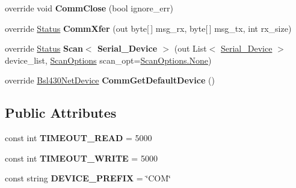 \begin{DoxyCompactItemize}
override void {\bfseries Comm\+Close} (bool ignore\+\_\+err)
\item 
\mbox{\label{class_b_s_l430___n_e_t_1_1_comm_1_1_comm_serial_a78d5d4bafe57eaaaffa336f272ca0051}} 
override \mbox{\hyperlink{class_b_s_l430___n_e_t_1_1_status}{Status}} {\bfseries Comm\+Xfer} (out byte\mbox{[}$\,$\mbox{]} msg\+\_\+rx, byte\mbox{[}$\,$\mbox{]} msg\+\_\+tx, int rx\+\_\+size)
\item 
\mbox{\label{class_b_s_l430___n_e_t_1_1_comm_1_1_comm_serial_ac393657c835b10ddc145bff688ca087e}} 
override \mbox{\hyperlink{class_b_s_l430___n_e_t_1_1_status}{Status}} {\bfseries Scan$<$ Serial\+\_\+\+Device $>$} (out List$<$ \mbox{\hyperlink{class_b_s_l430___n_e_t_1_1_comm_1_1_serial___device}{Serial\+\_\+\+Device}} $>$ device\+\_\+list, \mbox{\hyperlink{namespace_b_s_l430___n_e_t_a4cd6f8166a2a97ccb3405df2287d4ba8}{Scan\+Options}} scan\+\_\+opt=\mbox{\hyperlink{namespace_b_s_l430___n_e_t_a4cd6f8166a2a97ccb3405df2287d4ba8a6adf97f83acf6453d4a6a4b1070f3754}{Scan\+Options.\+None}})
\item 
\mbox{\label{class_b_s_l430___n_e_t_1_1_comm_1_1_comm_serial_a0b9cac5cd7fd047041f1a09bdd61fcc5}} 
override \mbox{\hyperlink{class_b_s_l430___n_e_t_1_1_bsl430_net_device}{Bsl430\+Net\+Device}} {\bfseries Comm\+Get\+Default\+Device} ()
\end{DoxyCompactItemize}
\subsection*{Public Attributes}
\begin{DoxyCompactItemize}
\item 
\mbox{\label{class_b_s_l430___n_e_t_1_1_comm_1_1_comm_serial_a4249e3814771938c054d19d07c580c4b}} 
const int {\bfseries T\+I\+M\+E\+O\+U\+T\+\_\+\+R\+E\+AD} = 5000
\item 
\mbox{\label{class_b_s_l430___n_e_t_1_1_comm_1_1_comm_serial_aea9e1f5ebd30c9816f35aac27e6433ec}} 
const int {\bfseries T\+I\+M\+E\+O\+U\+T\+\_\+\+W\+R\+I\+TE} = 5000
\item 
\mbox{\label{class_b_s_l430___n_e_t_1_1_comm_1_1_comm_serial_a8766c5ac71bf801860129d2dfa86f478}} 
const string {\bfseries D\+E\+V\+I\+C\+E\+\_\+\+P\+R\+E\+F\+IX} = \char`\"{}C\+OM\char`\"{}
\end{DoxyCompactItemize}
